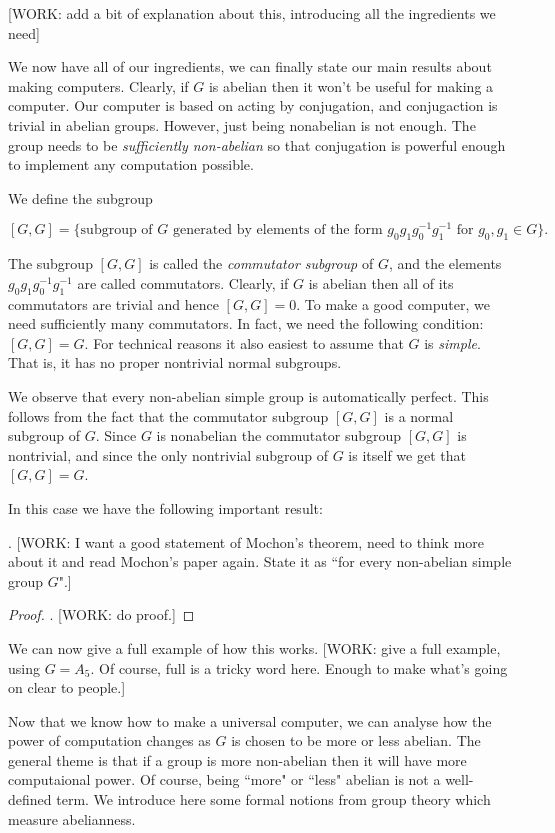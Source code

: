 [WORK: add a bit of explanation about this, introducing all the ingredients we need]

We now have all of our ingredients, we can finally state our main results about making computers. Clearly, if $G$ is abelian then it won't be useful for making a computer. Our computer is based on acting by conjugation, and conjugaction is trivial in abelian groups. However, just being nonabelian is not enough. The group needs to be \textit{sufficiently non-abelian} so that conjugation is powerful enough to implement any computation possible.

We define the subgroup

$$[G,G]=\{\text{subgroup of $G$ generated by elements of the form }g_{0}g_{1}g_{0}^{-1}g_{1}^{-1}\text{ for }g_0,g_1\in G\}.$$

The subgroup $[G,G]$ is called the \textit{commutator subgroup} of $G$, and the elements $g_{0}g_{1}g_{0}^{-1}g_{1}^{-1}$ are called commutators. Clearly, if $G$ is abelian then all of its commutators are trivial and hence $[G,G]=0$. To make a good computer, we need sufficiently many commutators. In fact, we need the following condition: $[G,G]=G$. For technical reasons it also easiest to assume that $G$ is \textit{simple}. That is, it has no proper nontrivial normal subgroups.

We observe that every non-abelian simple group is automatically perfect. This follows from the fact that the commutator subgroup $[G,G]$ is a normal subgroup of $G$. Since $G$ is nonabelian the commutator subgroup $[G,G]$ is nontrivial, and since the only nontrivial subgroup of $G$ is itself we get that $[G,G]=G$.

In this case we have the following important result:

\begin{theorem}[Mochon] . [WORK: I want a good statement of Mochon's theorem, need to think more about it and read Mochon's paper again. State it as ``for every non-abelian simple group $G$".]
\end{theorem}
\begin{proof} . [WORK: do proof.]
\end{proof}

We can now give a full example of how this works. [WORK: give a full example, using $G=A_5$. Of course, full is a tricky word here. Enough to make what's going on clear to people.]

Now that we know how to make a universal computer, we can analyse how the power of computation changes as $G$ is chosen to be more or less abelian. The general theme is that if a group is more non-abelian then it will have more computaional power. Of course, being ``more" or ``less" abelian is not a well-defined term. We introduce here some formal notions from group theory which measure abelianness.


